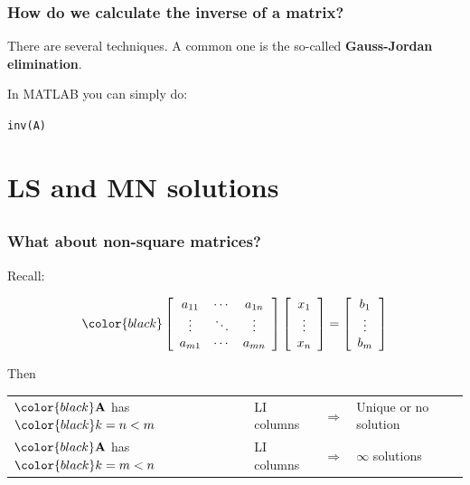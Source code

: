 \documentclass[compress]{beamer}
\newcommand{\black}[1]{{\color{black}#1}}
\renewcommand{\emph}[1]{\textbf{\black{#1}}}
\newcommand{\beq}[1]{\[\black{#1}\]}
\begin{document}

\begin{frame}[fragile]
\frametitle{How do we calculate the inverse of a matrix?}

There are several techniques. A common one is the so-called \emph{Gauss-Jordan elimination}.

\vspace{.5cm}

In MATLAB you can simply do:

\vspace{.5cm}

\color{black}
\verb|inv(A)|
\color{gray}

\end{frame}


\section{LS and MN solutions}
\subsection*{}


\begin{frame}
\frametitle{What about non-square matrices?}

\vspace{.5cm}
Recall:

\beq{
\left[ 
\begin{array}{ccc}
a_{11} & \cdots & a_{1n}\\
\vdots & \ddots & \vdots\\
a_{m1} &\cdots & a_{mn}
\end{array}
\right]\left[
\begin{array}{c}
x_1\\
\vdots\\
x_n
\end{array}
\right] = 
\left[
\begin{array}{c}
b_1\\
\vdots\\
b_m
\end{array}
\right]
}

\vspace{.5cm}
Then

\vspace{.5cm}

\begin{tabular}{llcl}
$\black{\A}$ has $\black{k = n < m}$ & LI columns & $\Rightarrow$ & Unique or no solution\\
$\black{\A}$ has $\black{k = m < n}$ & LI columns & $\Rightarrow$ & $\infty$ solutions
\end{tabular}

\end{frame}
\end{document}
